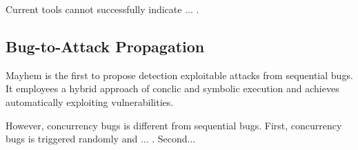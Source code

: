 Current tools cannot successfully indicate ... .



\subsection{Bug-to-Attack Propagation}

Mayhem\cite{mayhem:cmu} is the first to propose detection 
exploitable attacks from sequential bugs. It employees a hybrid 
approach of conclic and symbolic execution and achieves automatically 
exploiting vulnerabilities. 

However, concurrency bugs is different from sequential bugs. 
First, concurrency bugs is triggered randomly and ... .
Second...





